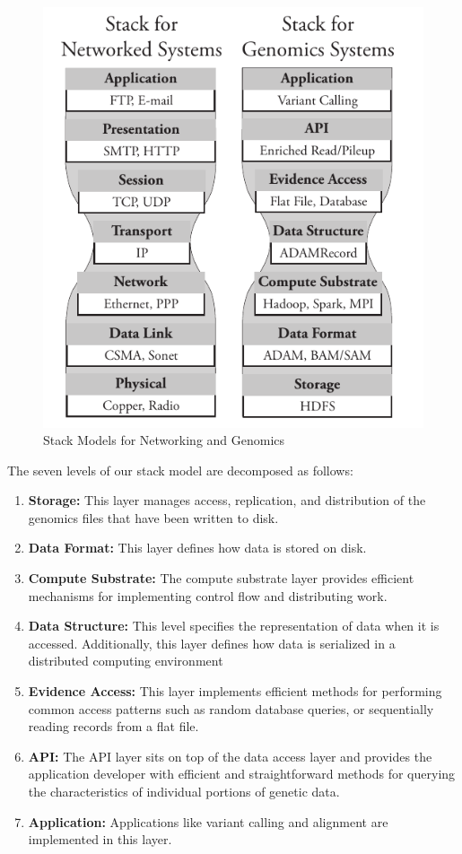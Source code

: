 \documentclass[10pt,twocolumn]{article}
\begin{document}
\begin{figure}[h]
\begin{center}
\includegraphics[width=0.9\linewidth]{stack-model.pdf}
\end{center}
\caption{Stack Models for Networking and Genomics}
\label{fig:stack-model}
\end{figure}

The seven levels of our stack model are decomposed as follows:

\begin{enumerate}
\item {\bf Storage:} This layer manages access, replication, and distribution of the genomics files that have been written to disk.
\item {\bf Data Format:} This layer defines how data is stored on disk.
\item {\bf Compute Substrate:} The compute substrate layer provides efficient mechanisms for implementing control flow and
distributing work.
\item {\bf Data Structure:} This level specifies the representation of data when it is accessed. Additionally, this layer defines how
data is serialized in a distributed computing environment
\item {\bf Evidence Access:} This layer implements efficient methods for performing common access patterns such as random database
queries, or sequentially reading records from a flat file. 
\item {\bf API:} The API layer sits on top of the data access layer and provides the application developer with efficient and
straightforward methods for querying the characteristics of individual portions of genetic data. 
\item {\bf Application:} Applications like variant calling and alignment are implemented in this layer.
\end{enumerate}
\end{document}
